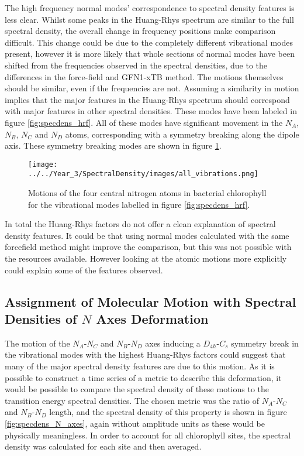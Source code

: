 The high frequency normal modes' correspondence to spectral density features is 
less clear. Whilst some peaks in the Huang-Rhys spectrum are similar to the full 
spectral density, the overall change in frequency positions make comparison difficult. 
This change could be due to the completely different vibrational modes present, 
however it is more likely that whole sections of normal modes have been shifted 
from the frequencies observed in the spectral densities, due to the differences 
in the force-field and GFN1-xTB method. The motions themselves should be similar,
even if the frequencies are not. Assuming a similarity in motion implies that the
major features in the Huang-Rhys spectrum should correspond with major features 
in other spectral densities. These modes have been labeled in figure \ref{fig:specdens_hrf}.
All of these modes have significant movement in the $N_A$, $N_B$, $N_C$ and $N_D$ 
atoms, corresponding with a symmetry breaking along the \Qy dipole axis. These 
symmetry breaking modes are shown in figure \ref{fig:hrf_vibrations}.

\begin{figure}
    \centering
    \texttt{[image: ../../Year\_3/SpectralDensity/images/all\_vibrations.png]}
    \caption{Motions of the four central nitrogen atoms in bacterial chlorophyll
    for the vibrational modes labelled in figure \ref{fig:specdens_hrf}.}
    \label{fig:hrf_vibrations}
\end{figure}

In total the Huang-Rhys factors do not offer a clean explanation of spectral density
features. It could be that using normal modes calculated with the same forcefield
method might improve the comparison, but this was not possible with the resources
available. However looking at the atomic motions more explicitly could explain some
of the features observed.

\subsection{Assignment of Molecular Motion with Spectral Densities of $N$ Axes Deformation}
\label{subsec:N_axes_deformation}

The motion of the $N_A$-$N_C$ and $N_B$-$N_D$ axes inducing a $D_{4h}$-$C_{s}$ symmetry
break in the vibrational modes with the highest Huang-Rhys factors could suggest
that many of the major spectral density features are due to this motion. As it is
possible to construct a time series of a metric to describe this deformation, it
would be possible to compare the spectral density of these motions to the transition
energy spectral densities. The chosen metric was the ratio of $N_A$-$N_C$ and $N_B$-$N_D$
length, and the spectral density of this property is shown in figure \ref{fig:specdens_N_axes},
again without amplitude units as these would be physically meaningless. In order
to account for all chlorophyll sites, the spectral density was calculated for each
site and then averaged.


